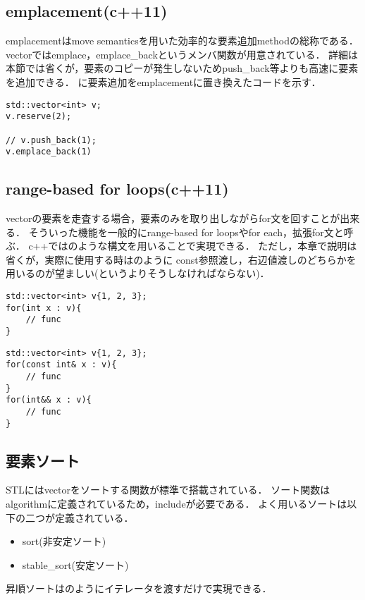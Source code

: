 \subsection{emplacement(c++11)}
emplacementはmove semanticsを用いた効率的な要素追加methodの総称である．
vectorではemplace，emplace\_backというメンバ関数が用意されている．
詳細は本節では省くが，要素のコピーが発生しないためpush\_back等よりも高速に要素を追加できる．
に要素追加をemplacementに置き換えたコードを示す．
\begin{lstlisting}[label=cd:vector_emplacement,caption=vector emplacement]
std::vector<int> v;
v.reserve(2);

// v.push_back(1);
v.emplace_back(1)
\end{lstlisting}


\subsection{range-based for loops(c++11)}
vectorの要素を走査する場合，要素のみを取り出しながらfor文を回すことが出来る．
そういった機能を一般的にrange-based for loopsやfor each，拡張for文と呼ぶ．
c++ではのような構文を用いることで実現できる．
ただし，本章で説明は省くが，実際に使用する時はのように
const参照渡し，右辺値渡しのどちらかを用いるのが望ましい(というよりそうしなければならない)．
\begin{lstlisting}[label=cd:vector_forEach,caption=range-based for loops]
std::vector<int> v{1, 2, 3};
for(int x : v){
    // func
}
\end{lstlisting}
\begin{lstlisting}[label=cd:vector_forEach2,caption=true range-based for loops]
std::vector<int> v{1, 2, 3};
for(const int& x : v){
    // func
}
for(int&& x : v){
    // func
}
\end{lstlisting}

\subsection{要素ソート}
STLにはvectorをソートする関数が標準で搭載されている．
ソート関数はalgorithmに定義されているため，includeが必要である．
よく用いるソートは以下の二つが定義されている．
\begin{itemize}
    \item sort(非安定ソート)
    \item stable\_sort(安定ソート)
\end{itemize}
昇順ソートはのようにイテレータを渡すだけで実現できる．

